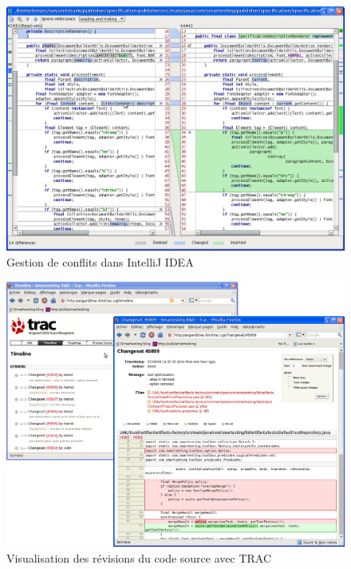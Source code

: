 \begin{figure}[!ht]
\centering
\includegraphics[width=\textwidth]{Illustrations/ideaMerge.png}
\caption{Gestion de conflits dans IntelliJ IDEA}
\label{figure:ideaMerge}
\end{figure}

\begin{figure}[!ht]
\centering
\includegraphics[width=\textwidth]{Illustrations/trac.png}
\caption{Visualisation des révisions du code source avec TRAC}
\label{figure:trac}
\end{figure}

